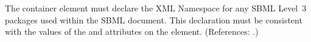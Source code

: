 The  container element must declare the XML Namespace for any
SBML Level~3 packages used within the SBML document.  This declaration must
be consistent with the values of the  and 
attributes on the  element.  (References: .)
